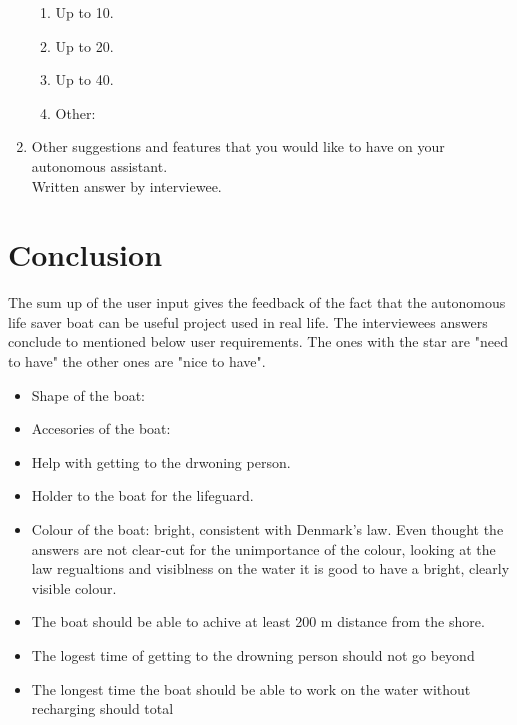 \documentclass{article}[10pt]
\begin{document}
\begin{enumerate}
    \begin{enumerate}
        \item  Up to 10.\\
        \item  Up to 20.\\
        \item  Up to 40.\\
        \item  Other:
    \end{enumerate}
    \item Other suggestions and features that you would like to have on your autonomous assistant.\\
            Written answer by interviewee.     
\end{enumerate}

\section*{Conclusion}
The sum up of the user input gives the feedback of the fact that the autonomous life saver boat can be useful project used in real life. The interviewees answers conclude to mentioned below user requirements. The ones with the star are "need to have" the other ones are "nice to have".
\begin{itemize}
     \item Shape of the boat:
     \item Accesories of the boat:
     \item Help with getting to the drwoning person.
     \item Holder to the boat for the lifeguard.
     \item Colour of the boat: bright, consistent with Denmark's law. Even thought the answers are not clear-cut for the unimportance of the colour, looking at the law regualtions and visiblness on the water it is good to have a bright, clearly visible colour.
     \item The boat should be able to achive at least 200 m distance from the shore.
     \item The logest time of getting to the drowning person should not go beyond
     \item The longest time the boat should be able to work on the water without recharging should total
\end{itemize}
\end{document}
